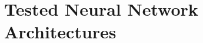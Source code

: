 \documentclass[preprint,12pt]{elsarticle}%
\begin{document}
%
%

\clearpage


\appendix


\section{Tested Neural Network Architectures}

\setcounter{table}{0}
\bigskip
\end{document}
